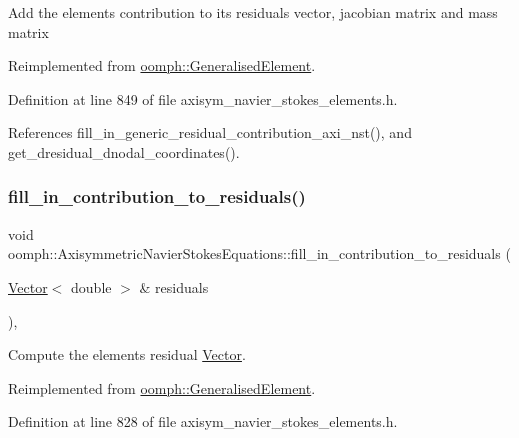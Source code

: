 Add the element\textquotesingle{}s contribution to its residuals vector, jacobian matrix and mass matrix 

Reimplemented from \hyperlink{classoomph_1_1GeneralisedElement_a2b6294a730647cf865da94f2531466f8}{oomph\+::\+Generalised\+Element}.



Definition at line 849 of file axisym\+\_\+navier\+\_\+stokes\+\_\+elements.\+h.



References fill\+\_\+in\+\_\+generic\+\_\+residual\+\_\+contribution\+\_\+axi\+\_\+nst(), and get\+\_\+dresidual\+\_\+dnodal\+\_\+coordinates().

\mbox{\label{classoomph_1_1AxisymmetricNavierStokesEquations_a3b9eb44ce84a06cee51b9fac3fb75673}} 
\subsubsection{\texorpdfstring{fill\+\_\+in\+\_\+contribution\+\_\+to\+\_\+residuals()}{fill\_in\_contribution\_to\_residuals()}}
{\footnotesize\ttfamily void oomph\+::\+Axisymmetric\+Navier\+Stokes\+Equations\+::fill\+\_\+in\+\_\+contribution\+\_\+to\+\_\+residuals (\begin{DoxyParamCaption}\item[{\hyperlink{classoomph_1_1Vector}{Vector}$<$ double $>$ \&}]{residuals }\end{DoxyParamCaption})\hspace{0.3cm}{\ttfamily [inline]}, {\ttfamily [virtual]}}



Compute the element\textquotesingle{}s residual \hyperlink{classoomph_1_1Vector}{Vector}. 



Reimplemented from \hyperlink{classoomph_1_1GeneralisedElement_a310c97f515e8504a48179c0e72c550d7}{oomph\+::\+Generalised\+Element}.



Definition at line 828 of file axisym\+\_\+navier\+\_\+stokes\+\_\+elements.\+h.



